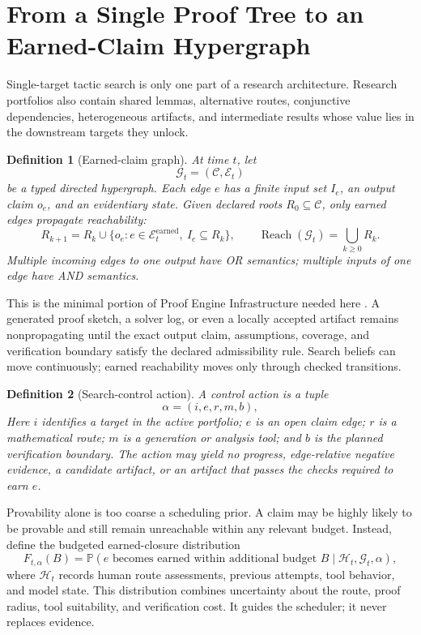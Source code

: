 \documentclass[11pt]{article}
\newtheorem{definition}{Definition}[section]
\newcommand{\Reach}{\operatorname{Reach}}
\newcommand{\Prob}{\mathbb{P}}
\begin{document}
\section{From a Single Proof Tree to an Earned-Claim Hypergraph}

Single-target tactic search is only one part of a research architecture.
Research portfolios also contain shared lemmas, alternative routes,
conjunctive dependencies, heterogeneous artifacts, and intermediate results
whose value lies in the downstream targets they unlock.

\begin{definition}[Earned-claim graph]\label{def:earned-graph}
At time $t$, let
\[
  \mathcal G_t=(\mathcal C,\mathcal E_t)
\]
be a typed directed hypergraph.  Each edge $e$ has a finite input set $I_e$, an
output claim $o_e$, and an evidentiary state.  Given declared roots
$R_0\subseteq\mathcal C$, only earned edges propagate reachability:
\[
  R_{k+1}=R_k\cup
  \{o_e:e\in\mathcal E_t^{\mathrm{earned}},\ I_e\subseteq R_k\},
  \qquad
  \Reach(\mathcal G_t)=\bigcup_{k\geq0}R_k.
\]
Multiple incoming edges to one output have OR semantics; multiple inputs of
one edge have AND semantics.
\end{definition}

This is the minimal portion of Proof Engine Infrastructure needed here
\citep{li2026proofengine}.  A generated proof sketch, a solver log, or even a
locally accepted artifact remains nonpropagating until the exact output claim,
assumptions, coverage, and verification boundary satisfy the declared
admissibility rule.  Search beliefs can move continuously; earned reachability
moves only through checked transitions.

\begin{definition}[Search-control action]\label{def:control-action}
A control action is a tuple
\[
  \alpha=(i,e,r,m,b),
\]
Here $i$ identifies a target in the active portfolio; $e$ is an open claim
edge; $r$ is a mathematical route; $m$ is a generation or analysis tool; and
$b$ is the planned verification boundary.  The action may yield no progress,
edge-relative negative evidence, a candidate artifact, or an artifact that
passes the checks required to earn $e$.
\end{definition}

Provability alone is too coarse a scheduling prior.  A claim may be highly
likely to be provable and still remain unreachable within any relevant budget.
Instead, define the budgeted earned-closure distribution
\[
  F_{t,\alpha}(B)
  =\Prob(
     e\text{ becomes earned within additional budget }B
     \mid \mathcal H_t,\mathcal G_t,\alpha),
\]
where $\mathcal H_t$ records human route assessments, previous attempts, tool
behavior, and model state.  This distribution combines uncertainty about the
route, proof radius, tool suitability, and verification cost.  It guides the
scheduler; it never replaces evidence.
\end{document}
